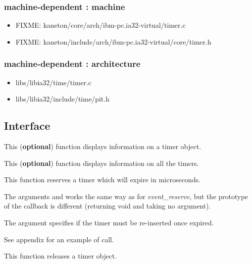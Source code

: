 \subsubsection{\color{filerefcolor} machine-dependent : machine}
\begin{itemize}
\item FIXME: kaneton/core/arch/ibm-pc.ia32-virtual/timer.c
\item FIXME: kaneton/include/arch/ibm-pc.ia32-virtual/core/timer.h
\end{itemize}

\subsubsection{\color{filerefcolor} machine-dependent : architecture}
\begin{itemize}
\item libs/libia32/time/timer.c
\item libs/libia32/include/time/pit.h
\end{itemize}

\newpage
\subsection*{Interface}

	 {
	   This (\textbf{optional}) function displays information on a
	   timer object.
	 }

	 {
	   This (\textbf{optional}) function displays information on
	   all the timers.
	 }

	 {
	   This function reserves a timer which will expire in
	    microseconds.

	   The arguments  and  works
	   the same way as for \emph{event\_reserve}, but the
	   prototype of the callback is different (returning void and
	   taking no argument).

	   The  argument specifies if the timer
	   must be re-inserted once expired.

	   See appendix for an example of call.
	 }

	 {
	   This function releases a timer object.
	 }

